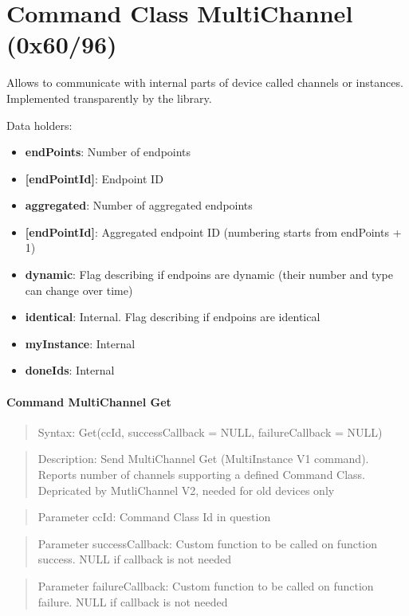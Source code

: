 \section{Command Class MultiChannel (0x60/96)}

Allows to communicate with internal parts of device called channels or instances. Implemented transparently by the library.
\newline

\noindent
Data holders:

\begin{itemize}
\item \textbf{endPoints}: Number of endpoints
\item \qquad\textbf{[endPointId]}: Endpoint ID
\item \textbf{aggregated}: Number of aggregated endpoints
\item \qquad\textbf{[endPointId]}: Aggregated endpoint ID (numbering starts from endPoints + 1)
\item \textbf{dynamic}: Flag describing if endpoins are dynamic (their number and type can change over time)
\item \textbf{identical}: Internal. Flag describing if endpoins are  identical
\item \textbf{myInstance}: Internal
\item \textbf{doneIds}: Internal
\end{itemize}

\paragraph{Command MultiChannel Get}
\begin{quote}Syntax: Get(ccId, successCallback = NULL, failureCallback = NULL)\end{quote}
\begin{quote}Description: Send MultiChannel Get (MultiInstance V1 command). Reports number of channels supporting a defined Command Class. Depricated by MutliChannel V2, needed for old devices only\end{quote}
\begin{quote}Parameter ccId: Command Class Id in question\end{quote}
\begin{quote}Parameter successCallback: Custom function to be called on function success. NULL if callback is not needed\end{quote}
\begin{quote}Parameter failureCallback: Custom function to be called on function failure. NULL if callback is not needed\end{quote}


